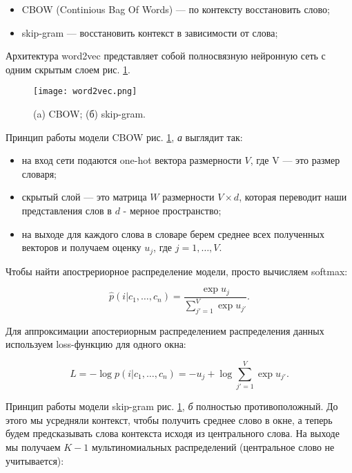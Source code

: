 \bigskip
\begin{itemize}
 \item CBOW (Continious Bag Of Words) --- по контексту восстановить слово;
 \item skip-gram --- восстановить контекст в зависимости от слова;
\end{itemize}

\bigskip
Архитектура word2vec представляет собой полносвязную нейронную сеть с одним скрытым слоем рис. \ref{fig:word2vec}.

\begin{figure}[ht]
    \centering
    \texttt{[image: word2vec.png]}
    \caption{(a) CBOW; (б) skip-gram.}
    \label{fig:word2vec}
\end{figure}

Принцип работы модели CBOW рис. \ref{fig:word2vec}, \textit{а}  выглядит так:

\bigskip
\begin{itemize}
 \item на вход сети подаются one-hot вектора размерности $V$, где V --- это размер словаря;
 \item скрытый слой --- это матрица $W$ размерности $V\times d$, которая переводит наши представления слов в $d$ - мерное пространство;
 \item на выходе для каждого слова в словаре берем среднее всех полученных векторов и получаем оценку $u_j$, где $j = 1, \ldots, V$.
\end{itemize}

\bigskip
Чтобы найти апострериорное распределение модели, просто вычисляем softmax:

\begin{equation}
 \hat{p}(i|c_1, \ldots, c_n) = \frac{\exp{u_j}}{\sum_{j'=1}^V \exp{u_{j'}}}.
\end{equation}

Для аппроксимации апостериорным распределением распределения данных используем loss-функцию для одного окна:

\begin{equation}
 L = -\log{p(i|c_1, \ldots, c_n)} = - u_j + \log{\sum_{j'=1}^{V} \exp{u_{j'}}}.
\end{equation}

Принцип работы модели skip-gram рис. \ref{fig:word2vec}, \textit{б} полностью противоположный. До этого мы усредняли контекст, чтобы получить среднее слово в окне, а теперь будем предсказывать слова контекста исходя из центрального слова. На выходе мы получаем $K-1$ мультиномиальных распределений (центральное слово не учитывается):

